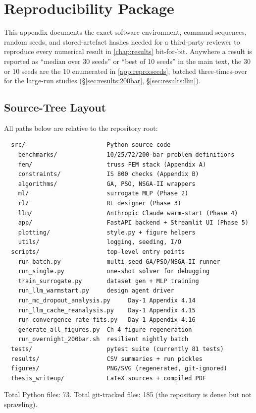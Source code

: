 \chapter{Reproducibility Package}
\label{app:repro}

This appendix documents the exact software environment, command
sequences, random seeds, and stored-artefact hashes needed for a
third-party reviewer to reproduce every numerical result in
\cref{chap:results} bit-for-bit. Anywhere a result is reported as
``median over 30 seeds'' or ``best of 10 seeds'' in the main text,
the 30 or 10 seeds are the 10 enumerated in
\cref{app:repro:seeds}, batched three-times-over for the
large-run studies (§\ref{sec:results:200bar},
§\ref{sec:results:llm}).

\section{Source-Tree Layout}
\label{app:repro:layout}

All paths below are relative to the repository root:
\begin{verbatim}
  src/                       Python source code
    benchmarks/              10/25/72/200-bar problem definitions
    fem/                     truss FEM stack (Appendix A)
    constraints/             IS 800 checks (Appendix B)
    algorithms/              GA, PSO, NSGA-II wrappers
    ml/                      surrogate MLP (Phase 2)
    rl/                      RL designer (Phase 3)
    llm/                     Anthropic Claude warm-start (Phase 4)
    app/                     FastAPI backend + Streamlit UI (Phase 5)
    plotting/                style.py + figure helpers
    utils/                   logging, seeding, I/O
  scripts/                   top-level entry points
    run_batch.py             multi-seed GA/PSO/NSGA-II runner
    run_single.py            one-shot solver for debugging
    train_surrogate.py       dataset gen + MLP training
    run_llm_warmstart.py     design agent driver
    run_mc_dropout_analysis.py     Day-1 Appendix 4.14
    run_llm_cache_reanalysis.py    Day-1 Appendix 4.15
    run_convergence_rate_fits.py   Day-1 Appendix 4.16
    generate_all_figures.py  Ch 4 figure regeneration
    run_overnight_200bar.sh  resilient nightly batch
  tests/                     pytest suite (currently 81 tests)
  results/                   CSV summaries + run pickles
  figures/                   PNG/SVG (regenerated, git-ignored)
  thesis_writeup/            LaTeX sources + compiled PDF
\end{verbatim}
Total Python files: \num{73}. Total git-tracked files:
\num{185} (the repository is dense but not sprawling).

